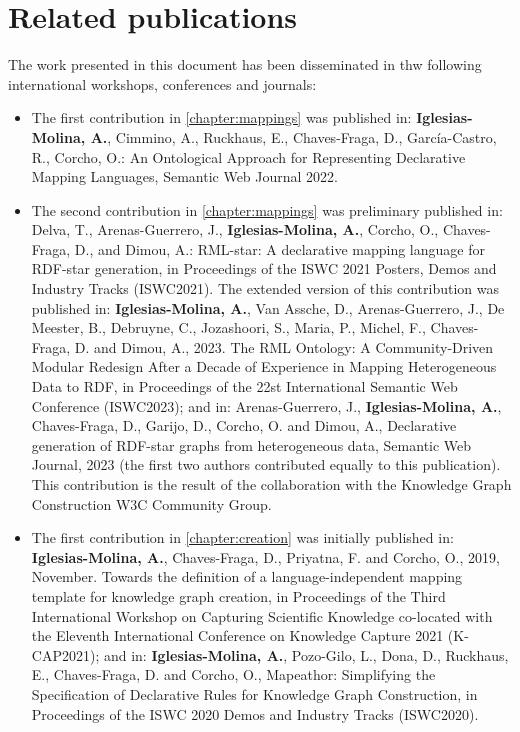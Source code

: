 \section{Related publications}

The work presented in this document has been disseminated in thw following international workshops, conferences and journals:

\begin{itemize}
    \item The first contribution in \cref{chapter:mappings} was published in: \textbf{Iglesias-Molina, A.}, Cimmino, A., Ruckhaus, E., Chaves-Fraga, D., García-Castro, R., Corcho, O.: An Ontological Approach for Representing Declarative Mapping Languages, Semantic Web Journal 2022.
    
    \item The second contribution  in \cref{chapter:mappings} was preliminary published in: Delva, T., Arenas-Guerrero, J.,\textbf{ Iglesias-Molina, A.}, Corcho, O., Chaves-Fraga, D., and Dimou, A.: RML-star: A declarative mapping language for RDF-star generation, in Proceedings of the ISWC 2021 Posters, Demos and Industry Tracks (ISWC2021). The extended version of this contribution was published in: \textbf{Iglesias-Molina, A.}, Van Assche, D., Arenas-Guerrero, J., De Meester, B., Debruyne, C., Jozashoori, S., Maria, P., Michel, F., Chaves-Fraga, D. and Dimou, A., 2023. The RML Ontology: A Community-Driven Modular Redesign After a Decade of Experience in Mapping Heterogeneous Data to RDF, in Proceedings of the 22st International Semantic Web Conference (ISWC2023); and in: Arenas-Guerrero, J., \textbf{Iglesias-Molina, A.}, Chaves-Fraga, D., Garijo, D., Corcho, O. and Dimou, A., Declarative generation of RDF-star graphs from heterogeneous data, Semantic Web Journal, 2023 (the first two authors contributed equally to this publication). This contribution is the result of the collaboration with the Knowledge Graph Construction W3C Community Group. 

    \item The first contribution in \cref{chapter:creation} was initially published  in: \textbf{Iglesias-Molina, A.}, Chaves-Fraga, D., Priyatna, F. and Corcho, O., 2019, November. Towards the definition of a language-independent mapping template for knowledge graph creation, in Proceedings of the Third International Workshop on Capturing Scientific Knowledge co-located with the Eleventh International Conference on Knowledge Capture 2021 (K-CAP2021); and in: \textbf{Iglesias-Molina, A.}, Pozo-Gilo, L., Dona, D., Ruckhaus, E., Chaves-Fraga, D. and Corcho, O., Mapeathor: Simplifying the Specification of Declarative Rules for Knowledge Graph Construction, in Proceedings of the ISWC 2020 Demos and Industry Tracks (ISWC2020).


\end{itemize}
